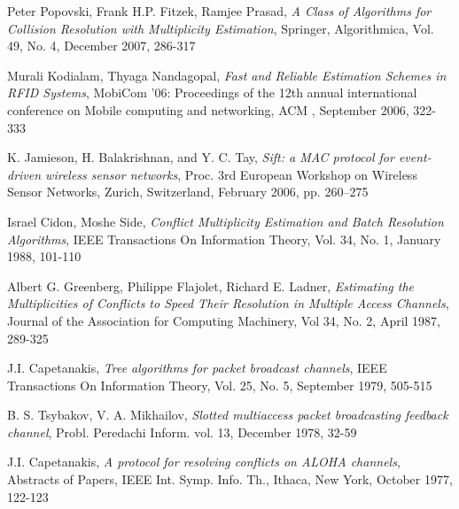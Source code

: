 \begin{thebibliography}{99}
 
  Peter Popovski, Frank H.P. Fitzek, Ramjee Prasad, \emph{ A Class of Algorithms for Collision Resolution with Multiplicity Estimation}, Springer, Algorithmica, Vol. 49, No. 4, December 2007, 286-317
  
Murali Kodialam, Thyaga Nandagopal, \emph{Fast and Reliable Estimation Schemes in RFID Systems}, MobiCom '06: Proceedings of the 12th annual international conference on Mobile computing and networking, ACM , September 2006, 322-333 
 
K. Jamieson, H. Balakrishnan, and Y. C. Tay, \emph{Sift: a MAC protocol for event-driven wireless sensor networks},  Proc. 3rd European Workshop on Wireless Sensor Networks, Zurich, Switzerland, February 2006, pp. 260–275 

 Israel Cidon, Moshe Side, \emph{Conflict Multiplicity Estimation and Batch Resolution Algorithms}, IEEE Transactions On Information Theory, Vol. 34, No. 1, January 1988, 101-110
 
  Albert G. Greenberg, Philippe Flajolet,  Richard E. Ladner,
  \emph{Estimating the Multiplicities of Conflicts to Speed Their Resolution in Multiple Access Channels},
  Journal of the Association for Computing Machinery,
  Vol 34, No. 2, April 1987, 289-325
 
  J.I. Capetanakis, \emph{ Tree algorithms for packet broadcast channels}, IEEE Transactions On Information Theory, Vol. 25, No. 5, September 1979, 505-515
 
B. S. Tsybakov, V. A. Mikhailov, \emph{Slotted multiaccess packet broadcasting feedback channel}, Probl. Peredachi Inform. vol. 13, December 1978, 32-59
 
J.I. Capetanakis, \emph{A protocol for resolving conflicts on ALOHA channels}, Abstracts of Papers, IEEE Int. Symp. Info. Th., Ithaca, New York, October 1977, 122-123

 \end{thebibliography}
 
